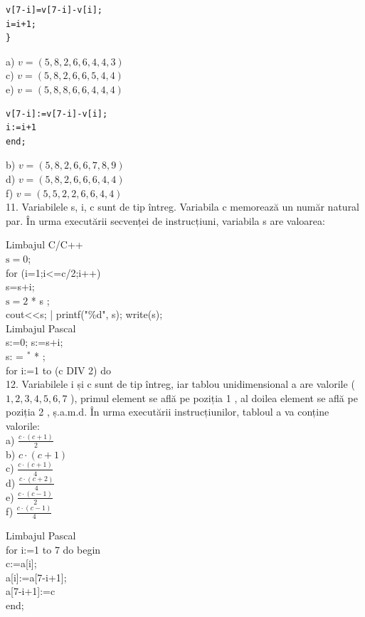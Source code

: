\documentclass[10pt]{article}
\begin{document}
\begin{verbatim}
v[7-i]=v[7-i]-v[i];
i=i+1;
}
\end{verbatim}

a) $v=(5,8,2,6,6,4,4,3)$\\
c) $v=(5,8,2,6,6,5,4,4)$\\
e) $v=(5,8,8,6,6,4,4,4)$

\begin{verbatim}
v[7-i]:=v[7-i]-v[i];
i:=i+1
end;
\end{verbatim}

b) $v=(5,8,2,6,6,7,8,9)$\\
d) $v=(5,8,2,6,6,6,4,4)$\\
f) $v=(5,5,2,2,6,6,4,4)$\\
11. Variabilele s, i, c sunt de tip întreg. Variabila c memorează un număr natural par. În urma executării secvenței de instrucțiuni, variabila s are valoarea:

Limbajul C/C++\\
$\mathrm{s}=0$;\\
for (i=1;i<=c/2;i++)\\
s=s+i;\\
$\mathrm{s}=2$ * s ;\\
cout<<s; | printf("\%d", s); write(s);\\
Limbajul Pascal\\
s:=0; s:=s+i;\\
s: = ${ }^{*}$ * ;\\
for i:=1 to (c DIV 2) do\\
12. Variabilele i și c sunt de tip întreg, iar tablou unidimensional a are valorile ( $1,2,3,4,5,6,7$ ), primul element se află pe poziția 1 , al doilea element se află pe poziția 2 , ș.a.m.d. În urma executării instrucțiunilor, tabloul a va conține valorile:\\
a) $\frac{c \cdot(c+1)}{2}$\\
b) $c \cdot(c+1)$\\
c) $\frac{c \cdot(c+1)}{4}$\\
d) $\frac{c \cdot(c+2)}{4}$\\
e) $\frac{c \cdot(c-1)}{2}$\\
f) $\frac{c \cdot(c-1)}{4}$

Limbajul Pascal\\
for i:=1 to 7 do begin\\[0pt]
c:=a[i];\\[0pt]
a[i]:=a[7-i+1];\\[0pt]
a[7-i+1]:=c\\
end;
\end{document}
